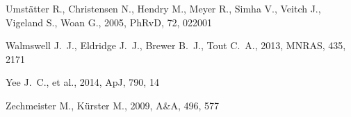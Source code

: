 \documentclass[useAMS,usenatbib]{mn2e}
\begin{document}
\begin{thebibliography}{99}
 Umst{\"a}tter R., Christensen N., Hendry 
M., Meyer R., Simha V., Veitch J., Vigeland S., Woan G., 2005, PhRvD, 72, 
022001 

 Walmswell J.~J., Eldridge J.~J., Brewer 
B.~J., Tout C.~A., 2013, MNRAS, 435, 2171

Yee J.~C., et al., 2014, ApJ, 790, 14 

 Zechmeister M., K{\"u}rster M., 2009, A\&A, 496, 577  

\end{thebibliography}
\end{document}
